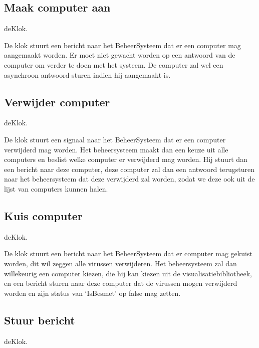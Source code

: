\documentclass[a4paper,oneside]{report}
\begin{document}

\newpage
\subsection{Maak computer aan}
deKlok.

De klok stuurt een bericht naar het BeheerSysteem dat er een computer mag aangemaakt worden. Er moet niet gewacht worden op een antwoord van de computer om verder te doen met het systeem. De computer zal wel een asynchroon antwoord sturen indien hij aangemaakt is.


\newpage
\subsection{Verwijder computer}
deKlok.

De klok stuurt een signaal naar het BeheerSysteem dat er een computer verwijderd mag worden. Het beheersysteem maakt dan een keuze uit alle computers en beslist welke computer er verwijderd mag worden. Hij stuurt dan een bericht naar deze computer, deze computer zal dan een antwoord terugsturen naar het beheersysteem dat deze verwijderd zal worden, zodat we deze ook uit de lijst van computers kunnen halen.


\newpage
\subsection{Kuis computer}
deKlok.

De klok stuurt een bericht naar het BeheerSysteem dat er computer mag gekuist worden, dit wil zeggen alle virussen verwijderen. Het beheersysteem zal dan willekeurig een computer kiezen, die hij kan kiezen uit de visualisatiebibliotheek, en een bericht sturen naar deze computer dat de virussen mogen verwijderd worden en zijn status van ‘IsBesmet’ op false mag zetten.


\newpage
\subsection{Stuur bericht}
deKlok.
\end{document}
